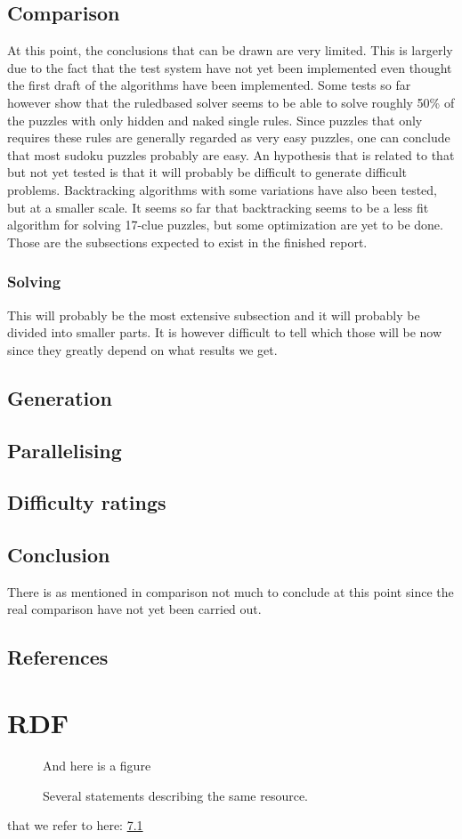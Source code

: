 \documentclass[a4paper,11pt]{kth-mag}
\begin{document}
\section{Comparison}

At this point, the conclusions that can be drawn are very limited. This is largerly due to the fact that the test system have not yet been implemented even thought the first draft of the algorithms have been implemented. Some tests so far however show that the ruledbased solver seems to be able to solve roughly 50\% of the puzzles with only hidden and naked single rules. Since puzzles that only requires these rules are generally regarded as very easy puzzles, one can conclude that most sudoku puzzles probably are easy. An hypothesis that is related to that but not yet tested is that it will probably be difficult to generate difficult problems. Backtracking algorithms with some variations have also been tested, but at a smaller scale. It seems so far that backtracking seems to be a less fit algorithm for solving 17-clue puzzles, but some optimization are yet to be done. 
Those are the subsections expected to exist in the finished report.
\subsection{Solving}

This will probably be the most extensive subsection and it will probably be divided into smaller parts. It is however difficult to tell which those will be now since they greatly depend on what results we get.
\section{Generation}

\section{Parallelising}

\section{Difficulty ratings}


\section{Conclusion}

There is as mentioned in comparison not much to conclude at this point since the real comparison have not yet been carried out.


\section{References}

\appendix
\addappheadtotoc
\chapter{RDF}\label{appA}

\begin{figure}[ht]
\begin{center}
And here is a figure
\caption{\small{Several statements describing the same resource.}}\label{RDF_4}
\end{center}
\end{figure}

that we refer to here: \ref{RDF_4}
\end{document}
